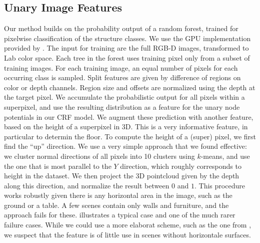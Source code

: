 \documentclass[a4paper, 10pt, conference]{ieeeconf}      %
\begin{document}
\subsection{Unary Image Features}
Our method builds on the probability output of a random forest, trained for pixelwise
classification of the structure classes.
We use the GPU implementation provided by \citet{stueckler2013}.
The input for training are the full RGB-D images, transformed to Lab
color space. Each tree in the forest uses training pixel only from a subset of
training images. For each training image, an equal number of pixels for each
occurring class is sampled. Split features are given by difference of regions
on color or depth channels. Region size and offsets are normalized using the
depth at the target pixel.
We accumulate the probabilistic output for all pixels within a superpixel, and
use the resulting distribution as a feature for the unary node potentials in our CRF model.
We augment these prediction with another feature, based on the height of a superpixel in 3D.
This is a very informative feature, in particular to determin the floor.
To compute the height of a (super) pixel, we first find the ``up'' direction.
We use a very simple approach that we found effective: we cluster normal directions of all pixels
into 10 clusters using $k$-means, and use the one that is most parallel to the $Y$ direction, which
roughly corresponds to height in the dataset.
We then project the 3D pointcloud given by the depth along this direction, and normalize the result between
$0$ and $1$.
This procedure works robustly given there is any horizontal area in the image,
such as the ground or a table. A few scenes contain only walls and furniture,
and the approach fails for these.  illustrates a typical case and
one of the much rarer failure cases.
While we could use a more elaborat scheme,
such as the one from \citet{SilbermanECCV12}, we suspect that the feature is of
little use in scenes without horizontale surfaces.
\end{document}
